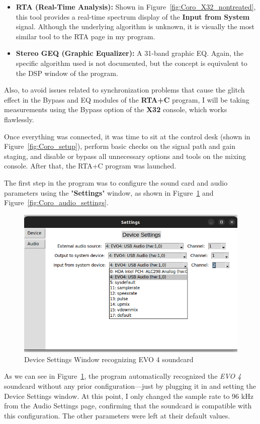 \begin{itemize}
	\item \textbf{RTA (Real-Time Analysis):} Shown in Figure~\ref{fig:Coro_X32_nontreated}, this tool provides a real-time spectrum display of the \textbf{Input from System} signal. Although the underlying algorithm is unknown, it is visually the most similar tool to the RTA page in my program.
	\item \textbf{Stereo GEQ (Graphic Equalizer):} A 31-band graphic EQ. Again, the specific algorithm used is not documented, but the concept is equivalent to the DSP window of the program.
\end{itemize}

Also, to avoid issues related to synchronization problems that cause the glitch effect in the Bypass and EQ modules of the \textbf{RTA+C} program, I will be taking measurements using the Bypass option of the \textbf{X32} console, which works flawlessly.

Once everything was connected, it was time to sit at the control desk (shown in Figure~\ref{fig:Coro_setup}), perform basic checks on the signal path and gain staging, and disable or bypass all unnecessary options and tools on the mixing console. After that, the RTA+C program was launched.

The first step in the program was to configure the sound card and audio parameters using the "\textbf{Settings}" window, as shown in Figure~\ref{fig:Coro_device_settings} and Figure~\ref{fig:Coro_audio_settings}.


\begin{figure}[H]
	\centering
	\includegraphics[width=0.8
	\linewidth]{Figures/Coro_Device_settings.png}
	\caption{Device Settings Window recognizing EVO 4 soundcard}
	\label{fig:Coro_device_settings}
\end{figure}

As we can see in Figure~\ref{fig:Coro_device_settings}, the program automatically recognized the \textit{EVO 4} soundcard without any prior configuration—just by plugging it in and setting the Device Settings window. At this point, I only changed the sample rate to 96 kHz from the Audio Settings page, confirming that the soundcard is compatible with this configuration. The other parameters were left at their default values.

